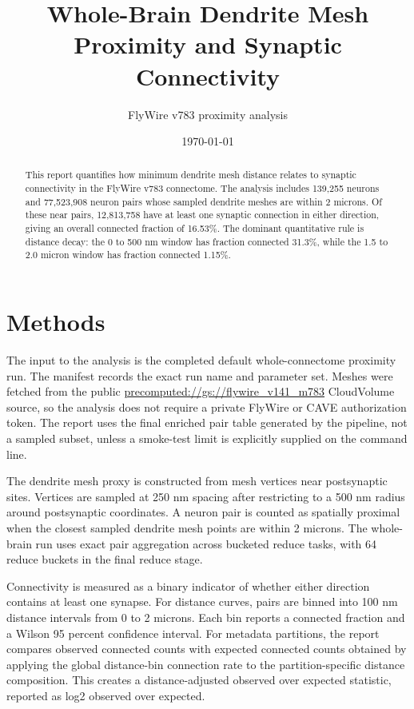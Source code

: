 \documentclass[11pt]{article}
\title{Whole-Brain Dendrite Mesh Proximity and Synaptic Connectivity}
\author{FlyWire v783 proximity analysis}
\date{\today}
\begin{document}
\maketitle

\begin{abstract}

This report quantifies how minimum dendrite mesh distance relates to synaptic connectivity in the FlyWire v783 connectome. The analysis includes 139,255 neurons and 77,523,908 neuron pairs whose sampled dendrite meshes are within 2 microns. Of these near pairs, 12,813,758 have at least one synaptic connection in either direction, giving an overall connected fraction of 16.53\%. The dominant quantitative rule is distance decay: the 0 to 500 nm window has fraction connected 31.3\%, while the 1.5 to 2.0 micron window has fraction connected 1.15\%.

\end{abstract}

\section{Methods}

The input to the analysis is the completed default whole-connectome proximity run. The manifest records the exact run name and parameter set. Meshes were fetched from the public \url{precomputed://gs://flywire_v141_m783} CloudVolume source, so the analysis does not require a private FlyWire or CAVE authorization token. The report uses the final enriched pair table generated by the pipeline, not a sampled subset, unless a smoke-test limit is explicitly supplied on the command line.

The dendrite mesh proxy is constructed from mesh vertices near postsynaptic sites. Vertices are sampled at 250 nm spacing after restricting to a 500 nm radius around postsynaptic coordinates. A neuron pair is counted as spatially proximal when the closest sampled dendrite mesh points are within 2 microns. The whole-brain run uses exact pair aggregation across bucketed reduce tasks, with 64 reduce buckets in the final reduce stage.

Connectivity is measured as a binary indicator of whether either direction contains at least one synapse. For distance curves, pairs are binned into 100 nm distance intervals from 0 to 2 microns. Each bin reports a connected fraction and a Wilson 95 percent confidence interval. For metadata partitions, the report compares observed connected counts with expected connected counts obtained by applying the global distance-bin connection rate to the partition-specific distance composition. This creates a distance-adjusted observed over expected statistic, reported as log2 observed over expected.
\end{document}
